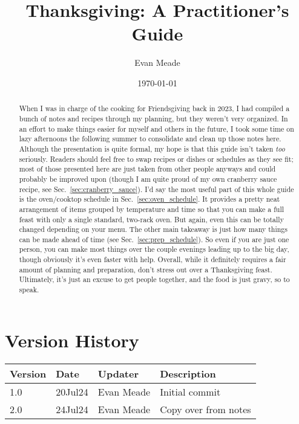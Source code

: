 \documentclass[12pt]{article}
\title{Thanksgiving: A Practitioner's Guide}
\author{Evan Meade}
\date{\today}
\begin{document}
	\fancyfoot[R]{\thepage}
	
	\maketitle
	
	\begin{abstract}
		When I was in charge of the cooking for Friendsgiving back in 2023, I had compiled a bunch of notes and recipes through my planning, but they weren't very organized. In an effort to make things easier for myself and others in the future, I took some time on lazy afternoons the following summer to consolidate and clean up those notes here. Although the presentation is quite formal, my hope is that this guide isn't taken \textit{too} seriously. Readers should feel free to swap recipes or dishes or schedules as they see fit; most of those presented here are just taken from other people anyways and could probably be improved upon (though I am quite proud of my own cranberry sauce recipe, see Sec.~\ref{sec:cranberry_sauce}). I'd say the most useful part of this whole guide is the oven/cooktop schedule in Sec.~\ref{sec:oven_schedule}. It provides a pretty neat arrangement of items grouped by temperature and time so that you can make a full feast with only a single standard, two-rack oven. But again, even this can be totally changed depending on your menu. The other main takeaway is just how many things can be made ahead of time (see Sec.~\ref{sec:prep_schedule}). So even if you are just one person, you can make most things over the couple evenings leading up to the big day, though obviously it's even faster with help. Overall, while it definitely requires a fair amount of planning and preparation, don't stress out over a Thanksgiving feast. Ultimately, it's just an excuse to get people together, and the food is just gravy, so to speak.
	\end{abstract}
	
	\newpage
	
	\section*{Version History}
	\begin{tabular}{|l|l|l|l|}
		\hline
		\textbf{Version} & \textbf{Date} & \textbf{Updater} & \textbf{Description} \\\hline
		1.0 & 20Jul24 & Evan Meade & Initial commit \\\hline
		2.0 & 24Jul24 & Evan Meade & Copy over from notes \\\hline
	\end{tabular}
	
\end{document}
